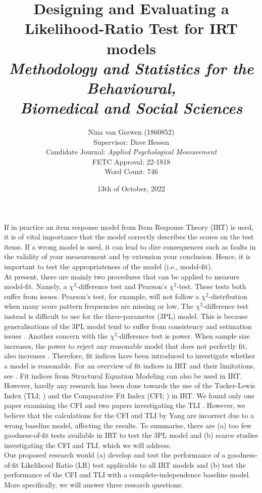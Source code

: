 \documentclass{article}
\title{%
	Designing and Evaluating a Likelihood-Ratio Test for IRT models \\
	\large \textit{Methodology and Statistics for the Behavioural, \\
	Biomedical and Social Sciences}}
\author{Nina van Gerwen (1860852) \\ 
	Supervisor: Dave Hessen \\ 
	\small {Candidate Journal: \textit{Applied Psychological Measurement}} \\
	\small {FETC Approval: 22-1818} \\
	\small {Word Count: 746}}
\date{13th of October, 2022}
\begin{document}
\maketitle

\newpage

\section{}
\indent If in practice an item response model from Item Response Theory (IRT) is used, it is of vital importance that the model correctly describes the scores on the test items. If a wrong model is used, it can lead to dire consequences such as faults in the validity of your measurement \autocite{consq1, consq2, consq3} and by extension your conclusion. Hence, it is important to test the appropriateness of the model (i.e., model-fit). \\
\indent At present, there are mainly two procedures that can be applied to measure model-fit. Namely, a $\chi^2$-difference test and Pearson's $\chi^2$-test. These tests both suffer from issues. Pearson's test, for example, will not follow a $\chi^2$-distribution when many score pattern frequencies are missing or low. The $\chi^2$-difference test instead is difficult to use for the three-parameter (3PL) model. This is because generalisations of the 3PL model tend to suffer from consistency and estimation issues \autocite{4plconsist1, 4plconsist2}. Another concern with the $\chi^2$-difference test is power. When sample size increases, the power to reject any reasonable model that does not perfectly fit, also increases \autocite{chi2sens}. Therefore, fit indices have been introduced to investigate whether a model is reasonable. For an overview of fit indices in IRT and their limitations, see \textcite{ref1}. Fit indices from Structural Equation Modeling can also be used in IRT. However, hardly any research has been done towards the use of the Tucker-Lewis Index (TLI; \cite{tli}) and the Comparative Fit Index (CFI; \cite{cfi}) in IRT. We found only one paper examining the CFI \autocite{yangfitindex} and two papers investigating the TLI \autocite{yangfitindex, tliirt}. However, we believe that the calculations for the CFI and TLI by Yang are incorrect due to a wrong baseline model, affecting the results. To summarise, there are (a) too few goodness-of-fit tests available in IRT to test the 3PL model and (b) scarce studies investigating the CFI and TLI, which we will address. \\
\indent Our proposed research would (a) develop and test the performance of a goodness-of-fit Likelihood Ratio (LR) test applicable to all IRT models and (b) test the performance of the CFI and TLI with a complete-independence baseline model. More specifically, we will answer three research questions:
\end{document}
